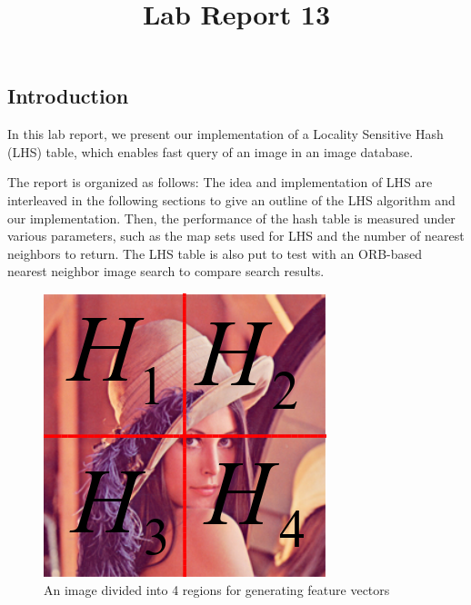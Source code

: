 \documentclass{ee208report}
\title{Lab Report 13}
\begin{document}
\begin{CJK}{UTF8}{gbsn}
    \maketitle
\end{CJK}

\begin{multicols*}{2}

\section{Introduction}

In this lab report, we present our implementation of a Locality Sensitive Hash
(LHS) table, which enables fast query of an image in an image database.

The report is organized as follows: The idea and implementation of LHS are
interleaved in the following sections to give an outline of the LHS algorithm
and our implementation. Then, the performance of the hash table is measured
under various parameters, such as the map sets used for LHS and the number of
nearest neighbors to return. The LHS table is also put to test with an ORB-based
nearest neighbor image search to compare search results.

\begin{figure}[H]
    \includegraphics[width=\linewidth]{images/4_regions.png}
    \caption{An image divided into 4 regions for generating feature vectors}
    \label{fig:regions}
\end{figure}


\end{multicols*}
\end{document}
